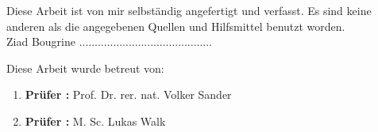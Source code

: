 %


\usepackage{beamerarticle}            %







\frontmatter

 

\newpage
Diese Arbeit ist von mir selbständig angefertigt und verfasst. Es sind keine anderen als die angegebenen Quellen und Hilfsmittel benutzt worden. \\
Ziad Bougrine ........................................... \\
\vspace{16cm}

\begin{normalsize}
	Diese Arbeit wurde betreut von:
\end{normalsize}
\begin{enumerate}
	\item \textbf{Prüfer :} Prof. Dr. rer. nat. Volker Sander
	\item \textbf{Prüfer :} M. Sc. Lukas Walk
\end{enumerate}

